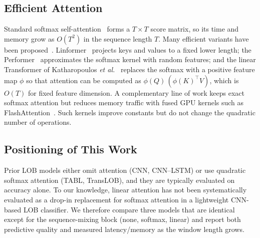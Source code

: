 \subsection{Efficient Attention}
Standard softmax self-attention~\cite{vaswani2017attention} forms a
$T \times T$ score matrix, so its time and memory grow as $O(T^2)$ in the
sequence length $T$. Many efficient variants have been
proposed~\cite{tay2022efficient}. Linformer~\cite{wang2020linformer}
projects keys and values to a fixed lower length; the
Performer~\cite{choromanski2021performer} approximates the softmax kernel
with random features; and the linear Transformer of Katharopoulos
\emph{et al.}~\cite{katharopoulos2020transformers} replaces the softmax
with a positive feature map $\phi$ so that attention can be computed as
$\phi(Q)\,(\phi(K)^{\top} V)$, which is $O(T)$ for fixed feature
dimension. A complementary line of work keeps exact softmax attention but
reduces memory traffic with fused GPU kernels such as
FlashAttention~\cite{dao2022flashattention}. Such kernels improve constants
but do not change the quadratic number of operations.

\subsection{Positioning of This Work}
Prior LOB models either omit attention (CNN, CNN--LSTM) or use quadratic
softmax attention (TABL, TransLOB), and they are typically evaluated on
accuracy alone. To our knowledge, linear attention has not been
systematically evaluated as a drop-in replacement for softmax attention in
a lightweight CNN-based LOB classifier. We therefore compare three models
that are identical except for the sequence-mixing block (none, softmax,
linear) and report both predictive quality and measured latency/memory as
the window length grows.
